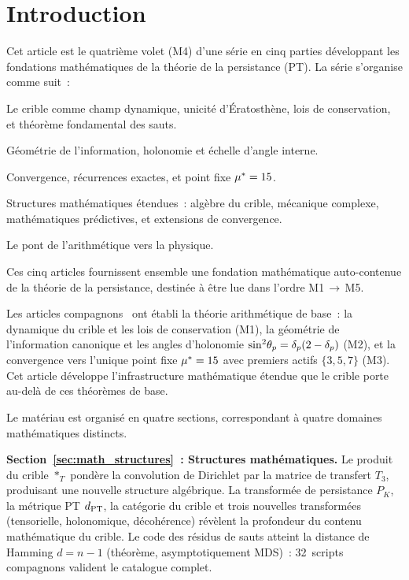 \documentclass[12pt,a4paper]{article}
\begin{document}
\tableofcontents
\newpage

\section{Introduction}
\label{sec:intro}

Cet article est le quatrième volet (M4) d'une série en cinq parties
développant les fondations mathématiques de la théorie de la
persistance (PT). La série s'organise comme suit~:
\begin{description}[nosep]
\item[M1~\cite{companion_M1}~:] Le crible comme champ dynamique,
  unicité d'Ératosthène, lois de conservation, et théorème
  fondamental des sauts.
\item[M2~\cite{companion_M2}~:] Géométrie de l'information, holonomie
  et échelle d'angle interne.
\item[M3~\cite{companion_M3}~:] Convergence, récurrences exactes, et
  point fixe ${\mu^{*}} = 15$.
\item[M4 (cet article)~:] Structures mathématiques étendues~: algèbre
  du crible, mécanique complexe, mathématiques prédictives, et
  extensions de convergence.
\item[M5~\cite{companion_M5}~:] Le pont de l'arithmétique vers la
  physique.
\end{description}

\noindent
Ces cinq articles fournissent ensemble une fondation mathématique
auto-contenue de la théorie de la persistance, destinée à être lue
dans l'ordre M1\,$\to$\,M5.

Les articles compagnons~\cite{companion_M1,companion_M2,companion_M3}
ont établi la théorie arithmétique de base~: la dynamique du crible
et les lois de conservation (M1), la géométrie de l'information
canonique et les angles d'holonomie
$\sin^2\!\theta_{p} = \delta_p(2 - \delta_p)$ (M2), et la convergence vers
l'unique point fixe ${\mu^{*}} = 15$ avec premiers actifs
$\{3, 5, 7\}$ (M3). Cet article développe l'infrastructure
mathématique étendue que le crible porte au-delà de ces théorèmes de
base.

Le matériau est organisé en quatre sections, correspondant à quatre
domaines mathématiques distincts.

\textbf{Section~\ref{sec:math_structures}~: Structures mathématiques.}
Le produit du crible $*_T$ pondère la convolution de Dirichlet par la
matrice de transfert $T_3$, produisant une nouvelle structure
algébrique. La transformée de persistance $P_K$, la métrique PT
$d_{\rm PT}$, la catégorie du crible et trois nouvelles transformées
(tensorielle, holonomique, décohérence) révèlent la profondeur du
contenu mathématique du crible. Le code des résidus de sauts atteint
la distance de Hamming $d = n - 1$ (théorème, asymptotiquement
MDS)~: 32~scripts compagnons valident le catalogue complet.
\end{document}
